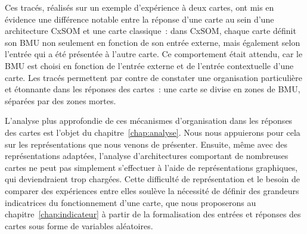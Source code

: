 \documentclass[../main]{subfiles}
\begin{document}
Ces tracés, réalisés sur un exemple d'expérience à deux cartes, ont mis en évidence une différence notable entre la réponse d'une carte au sein d'une architecture CxSOM et une carte classique~: dans CxSOM, chaque carte définit son BMU non seulement en fonction de son entrée externe, mais également selon l'entrée qui a été présentée à l'autre carte. Ce comportement était attendu, car le BMU est choisi en fonction de l'entrée externe et de l'entrée contextuelle d'une carte. Les tracés permettent par contre de constater une organisation particulière et étonnante dans les réponses des cartes~: une carte se divise en zones de BMU, séparées par des zones mortes.

L'analyse plus approfondie de ces mécanismes d'organisation dans les réponses des cartes est l'objet du chapitre~\ref{chap:analyse}. Nous nous appuierons pour cela sur les représentations que nous venons de présenter.
Ensuite, même avec des représentations adaptées, l'analyse d'architectures comportant de nombreuses cartes ne peut pas simplement s'effectuer à l'aide de représentations graphiques, qui deviendraient trop chargées. 
Cette difficulté de représentation et le besoin de comparer des expériences entre elles soulève la nécessité de définir des grandeurs indicatrices du fonctionnement d'une carte, que nous proposerons au chapitre~\ref{chap:indicateur} à partir de la formalisation des entrées et réponses des cartes sous forme de variables aléatoires.

\ifSubfilesClassLoaded{
    \printbibliography
}{}
\end{document}
